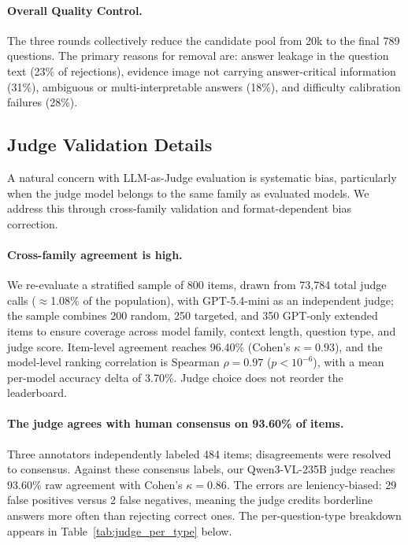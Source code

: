 \documentclass{llmxive}
\begin{document}
\paragraph{Overall Quality Control.}
The three rounds collectively reduce the candidate pool from 20k to the final 789 questions. The primary reasons for removal are: answer leakage in the question text (23\% of rejections), evidence image not carrying answer-critical information (31\%), ambiguous or multi-interpretable answers (18\%), and difficulty calibration failures (28\%).



\subsection{Judge Validation Details}
\label{app:judge_validation}

A natural concern with LLM-as-Judge evaluation is systematic bias, particularly when the judge model belongs to the same family as evaluated models.
We address this through cross-family validation and format-dependent bias correction.

\paragraph{Cross-family agreement is high.}
We re-evaluate a stratified sample of 800 items, drawn from 73{,}784 total judge calls (${\approx}$1.08\% of the population), with GPT-5.4-mini as an independent judge; the sample combines 200 random, 250 targeted, and 350 GPT-only extended items to ensure coverage across model family, context length, question type, and judge score.
Item-level agreement reaches 96.40\% (Cohen's $\kappa = 0.93$), and the model-level ranking correlation is Spearman $\rho = 0.97$ ($p < 10^{-6}$), with a mean per-model accuracy delta of 3.70\%.
Judge choice does not reorder the leaderboard.

\paragraph{The judge agrees with human consensus on 93.60\% of items.}
Three annotators independently labeled 484 items; disagreements were resolved to consensus.
Against these consensus labels, our Qwen3-VL-235B judge reaches 93.60\% raw agreement with Cohen's $\kappa = 0.86$.
The errors are leniency-biased: 29 false positives versus 2 false negatives, meaning the judge credits borderline answers more often than rejecting correct ones.
The per-question-type breakdown appears in Table~\ref{tab:judge_per_type} below.
\end{document}
